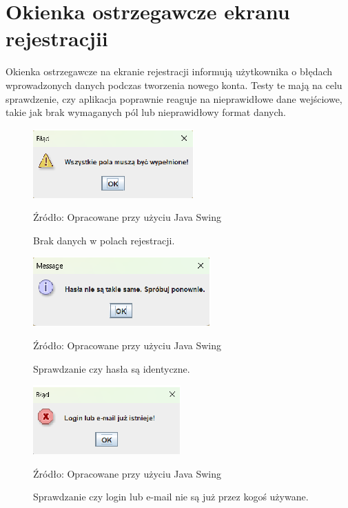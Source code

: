 \section{Okienka ostrzegawcze ekranu rejestracjii}
Okienka ostrzegawcze na ekranie rejestracji informują użytkownika o błędach wprowadzonych danych podczas tworzenia nowego konta. Testy te mają na celu sprawdzenie, czy aplikacja poprawnie reaguje na nieprawidłowe dane wejściowe, takie jak brak wymaganych pól lub nieprawidłowy format danych.

\begin{figure}[H]
    \centering
    \includegraphics[width=0.8\linewidth]{figures/r1.eps}
    \caption{Brak danych w polach rejestracji.}
    \label{fig:register_win}
    \small{Źródło: Opracowane przy użyciu Java Swing}
\end{figure}
\clearpage

\begin{figure}[H]
    \centering
    \includegraphics[width=0.8\linewidth]{figures/r2.eps}
    \caption{Sprawdzanie czy hasła są identyczne.}
    \label{fig:register_win}
    \small{Źródło: Opracowane przy użyciu Java Swing}
    \end{figure}
\clearpage

\begin{figure}[H]
    \centering  
    \includegraphics[width=0.8\linewidth]{figures/r3.eps}
    \caption{Sprawdzanie czy login lub e-mail nie są już przez kogoś używane.}
    \label{fig:register_win}
    \small{Źródło: Opracowane przy użyciu Java Swing}
    \end{figure}
\clearpage

